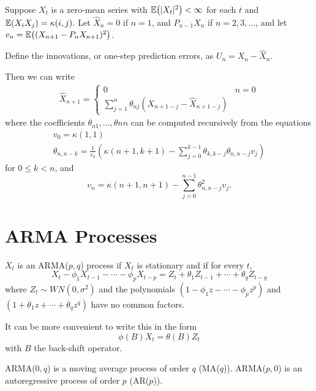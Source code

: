 \begin{thm}
  \label{defn:stationary_processes:2}
  Suppose $X_{t}$ is a zero-mean series with $\E{|X_{t}|^{2}} <
  \infty$ for each $t$ and $\E{X_{i} X_{j}} = \kappa(i, j)$.
  Let $\hat X_{n} = 0$ if $n = 1$, and $P_{n-1} X_{n}$ if $n = 2, 3,
  \dots$, and let $v_{n} = \E{(X_{n+1} - P_{n} X_{n+1})^{2}}$.

  Define the innovations, or one-step prediction errors, as $U_{n} =
  X_{n} - \hat X_{n}$.

  Then we can write
  \begin{align}
    \label{eq:16}
    \hat X_{n+1} =
    \begin{cases}
      0 & n = 0 \\
      \sum_{j=1}^{n} \theta_{nj}(X_{n+1-j} - \hat X_{n+1 - j})
    \end{cases}
  \end{align}
  where the coefficients $\theta_{n1}, \dots, \theta{nn}$ can be
  computed recursively from the equations
  \begin{align}
    \label{eq:17}
    v_{0} = \kappa(1, 1) \\
    \theta_{n, n-k} = \frac{1}{v_{k}}(\kappa(n+1, k+1) -
    \sum_{j=0}^{k-1} \theta_{k, k-j} \theta_{n, n-j} v_{j})
  \end{align}  for $0 \leq k < n$, and
  \begin{equation}
    \label{eq:18}
    v_{n} = \kappa(n+1, n+1) - \sum_{j=0}^{n-1} \theta^{2}_{n, n-j} v_{j}.
  \end{equation}
\end{thm}


\section{ARMA Processes}
\label{sec:arma-processes}

\begin{defn}
  \label{defn:arma_processes:1}
  $X_{t}$ is an ARMA($p, q$) process if $X_{t}$ is stationary and if
  for every $t$,
  \begin{equation}
    \label{eq:14}
    X_{t} - \phi_{1} X_{t-1} - \cdots - \phi_{p} X_{t-p} = Z_{t} +
    \theta_{1} Z_{t-1} + \cdots + \theta_{q} Z_{t-q}
  \end{equation} where $Z_{t} \sim WN(0, \sigma^{2})$  and the
  polynomials $(1 - \phi_{1}z - \cdots - \phi_{p} z^{p})$ and $(1 +
  \theta_{1} z + \cdots + \theta_{q} z^{q})$ have no common factors.

  It can be more convenient to write this in the form
  \begin{equation}
    \label{eq:19}
    \phi(B) X_{t} = \theta(B) Z_{t}
  \end{equation}
  with $B$ the back-shift operator.

  ARMA($0, q$) is a moving average process of order $q$ (MA($q$)).
  ARMA($p, 0$) is an autoregressive process of order $p$ (AR($p$)).
\end{defn}

